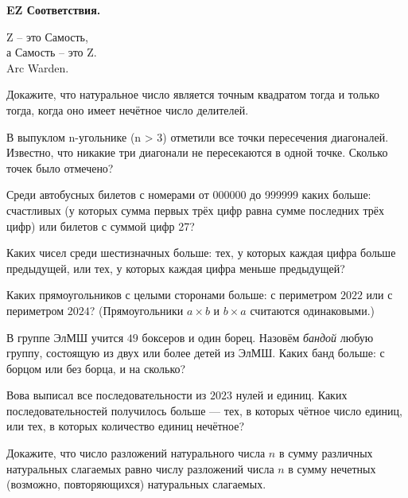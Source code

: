 \centerline{\bf \Huge EZ Соответствия.}

\begin{flushright}
        \scriptsize{Z – это Самость,\\ а Самость – это Z.\\Arc Warden.}
\end{flushright}


Докажите, что натуральное число является точным квадратом тогда и только тогда, когда оно имеет нечётное число делителей.

В выпуклом n-угольнике (n > 3) отметили все точки пересечения диагоналей. Известно, что никакие три диагонали не пересекаются в одной точке. Сколько точек было отмечено?

Среди автобусных билетов с номерами от 000000 до 999999 каких больше: счастливых (у которых сумма первых трёх цифр равна сумме последних трёх цифр) или билетов с суммой цифр 27?

Каких чисел среди шестизначных больше: тех, у которых каждая цифра больше предыдущей, или тех, у которых каждая цифра меньше предыдущей?

Каких прямоугольников с целыми сторонами больше: с периметром $2022$ или с периметром $2024$? (Прямоугольники $a \times b$ и $b \times a$ считаются одинаковыми.)

В группе ЭлМШ учится $49$ боксеров и один борец. Назовём \textit{бандой} любую группу, состоящую из двух или более детей из ЭлМШ. Каких банд больше: с борцом или без борца, и на сколько?

Вова выписал все последовательности из $2023$ нулей и единиц. Каких последовательностей получилось больше --- тех, в которых чётное число единиц, или тех, в которых количество единиц нечётное?

Докажите, что число разложений натурального числа $n$ в сумму различных натуральных слагаемых равно числу разложений числа $n$ в сумму нечетных (возможно, повторяющихся) натуральных слагаемых.
